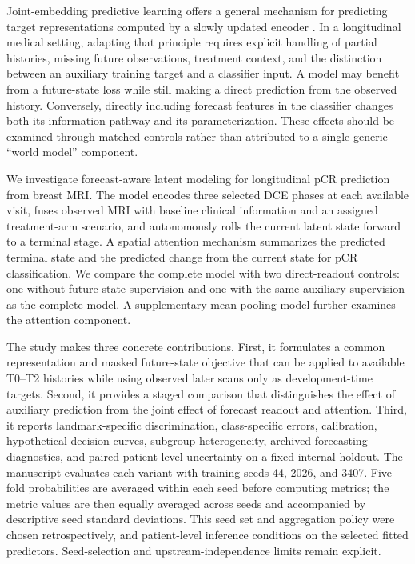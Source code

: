Joint-embedding predictive learning offers a general mechanism for predicting target representations computed by a slowly updated encoder \citep{jepa2023}. In a longitudinal medical setting, adapting that principle requires explicit handling of partial histories, missing future observations, treatment context, and the distinction between an auxiliary training target and a classifier input. A model may benefit from a future-state loss while still making a direct prediction from the observed history. Conversely, directly including forecast features in the classifier changes both its information pathway and its parameterization. These effects should be examined through matched controls rather than attributed to a single generic ``world model'' component.

We investigate forecast-aware latent modeling for longitudinal pCR prediction from breast MRI. The model encodes three selected DCE phases at each available visit, fuses observed MRI with baseline clinical information and an assigned treatment-arm scenario, and autonomously rolls the current latent state forward to a terminal stage. A spatial attention mechanism summarizes the predicted terminal state and the predicted change from the current state for pCR classification. We compare the complete model with two direct-readout controls: one without future-state supervision and one with the same auxiliary supervision as the complete model. A supplementary mean-pooling model further examines the attention component.

The study makes three concrete contributions. First, it formulates a common representation and masked future-state objective that can be applied to available T0--T2 histories while using observed later scans only as development-time targets. Second, it provides a staged comparison that distinguishes the effect of auxiliary prediction from the joint effect of forecast readout and attention. Third, it reports landmark-specific discrimination, class-specific errors, calibration, hypothetical decision curves, subgroup heterogeneity, archived forecasting diagnostics, and paired patient-level uncertainty on a fixed internal holdout. The manuscript evaluates each variant with training seeds 44, 2026, and 3407. Five fold probabilities are averaged within each seed before computing metrics; the metric values are then equally averaged across seeds and accompanied by descriptive seed standard deviations. This seed set and aggregation policy were chosen retrospectively, and patient-level inference conditions on the selected fitted predictors. Seed-selection and upstream-independence limits remain explicit.
